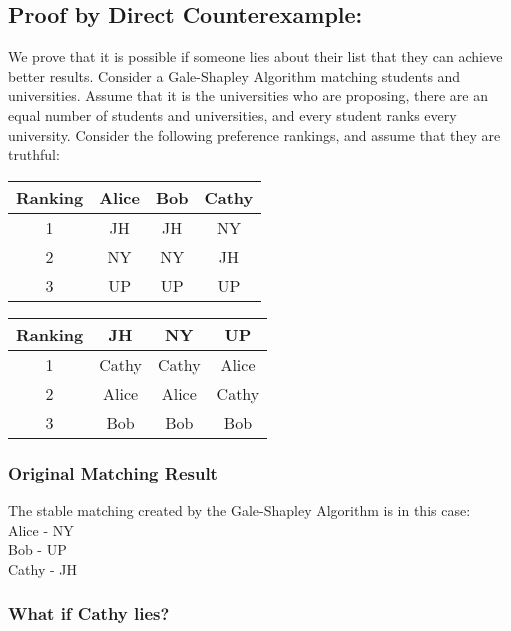 \documentclass[11pt]{article}
\begin{document}
\subsection{Proof by Direct Counterexample: }

We prove that it is possible if someone lies about their list that they can achieve better results. Consider a Gale-Shapley Algorithm matching students and universities. Assume that it is the universities who are proposing, there are an equal number of students and universities, and every student ranks every university. Consider the following preference rankings, and assume that they are truthful:

\vspace{5mm}
\noindent
\begin{minipage}{.5\textwidth}
\begin{tabular}{|c|ccc|}
\hline
    Ranking & Alice & Bob & Cathy \\ \hline
    1 & JH & JH & NY \\
    2 & NY & NY & JH \\
    3 & UP & UP & UP \\ \hline
\end{tabular}
\end{minipage}\hfill
\begin{minipage}{.35\textwidth}
    \begin{tabular}{|c|ccc|}
\hline
    Ranking & JH & NY & UP \\ \hline
    1 & Cathy & Cathy & Alice \\
    2 & Alice & Alice & Cathy \\
    3 & Bob & Bob & Bob \\ \hline
\end{tabular}
\end{minipage}

\subsubsection{Original Matching Result}

The stable matching created by the Gale-Shapley Algorithm is in this case: \\
Alice - NY \\
Bob - UP \\
Cathy - JH \\

\subsubsection{What if Cathy lies?}
\end{document}
